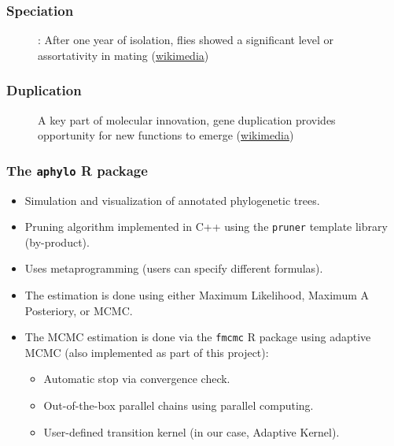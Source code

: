 \documentclass[aspectratio=169, 9pt]{beamer}\usepackage[]{graphicx}\usepackage[]{color}
\newcommand{\aphylopkg}[0]{\texttt{aphylo}}
\begin{document}
\begin{frame}[label = duplicationvsspeciation]
\frametitle{Speciation}
\begin{figure}
\centering
\def\svgwidth{.8\linewidth}
\tiny

\caption{\cite{Dodd1989}: After one year of isolation, flies showed a significant level or assortativity in mating (\href{https://commons.wikimedia.org/wiki/File:Drosophila_speciation_experiment.svg}{wikimedia})}
\end{figure}

\vfill\hfill \hyperlink{aphylographicalview}{}

\end{frame}

\begin{frame}
\frametitle{Duplication}
\begin{figure}
\centering
\def\svgwidth{.6\linewidth}
\tiny

\caption{A key part of molecular innovation, gene duplication provides opportunity for new functions to emerge (\href{https://en.wikipedia.org/wiki/File:Evolution_fate_duplicate_genes_-_vector.svg}{wikimedia})}
\end{figure}

\vfill\hfill \hyperlink{aphylographicalview}{}

\end{frame}

\begin{frame}[label=aphylopkg]
\frametitle{The \aphylopkg{} R package}

\begin{itemize}
\item Simulation and visualization of annotated phylogenetic trees.
\item Pruning algorithm implemented in C++ using the \texttt{pruner} template library (by-product).
\item Uses metaprogramming (users can specify different formulas).
\item The estimation is done using either Maximum Likelihood, Maximum A Posteriory, or MCMC.
\item The MCMC estimation is done via the \texttt{fmcmc} R package using adaptive MCMC
(also implemented as part of this project):
\begin{itemize}
\item Automatic stop via convergence check.
\item Out-of-the-box parallel chains using parallel computing.
\item User-defined transition kernel (in our case, Adaptive Kernel).
\end{itemize}
\end{itemize}

\vfill\hfill \hyperlink{aphylographicalview}{}
\end{frame}
\end{document}

